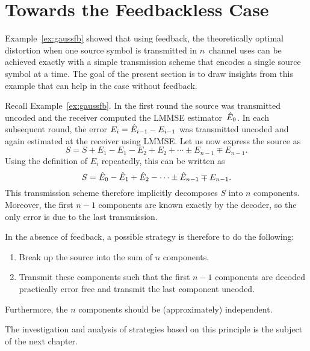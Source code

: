 \section{Towards the Feedbackless Case}

Example~\ref{ex:gaussfb} showed that using feedback, the theoretically optimal
distortion when one source symbol is transmitted in $n$~channel uses can be
achieved exactly with a simple transmission scheme that encodes a single source
symbol at a time. The goal of the present section is to draw insights from this
example that can help in the case without feedback. 

Recall Example~\ref{ex:gaussfb}. In the first round the source was
transmitted uncoded and the receiver computed the LMMSE estimator~$\hat{E}_0$. In
each subsequent round, the error $E_i = \hat{E}_{i-1} - E_{i-1}$ was transmitted
uncoded and again estimated at the receiver using LMMSE. Let us now express the
source as
\begin{equation*}
  S = S + E_1 - E_1 - E_2 + E_2 + \cdots \pm E_{n-1} \mp E_{n-1}.
\end{equation*}
Using the definition of $E_i$ repeatedly, this can be written as
\begin{equation*}
  S = \hat{E}_0 - \hat{E}_1 + \hat{E}_2 - \cdots \pm \hat{E}_{n-1} \mp E_{n-1}.
\end{equation*}
This transmission scheme therefore implicitly decomposes $S$ into $n$
components. Moreover, the first $n-1$ components are known exactly by the
decoder, so the only error is due to the last transmission.

In the absence of feedback, a possible strategy is therefore to do the
following:
\begin{enumerate}
  \item Break up the source into the sum of $n$ components.
  \item Transmit these components such that the first $n-1$ components are
    decoded practically error free and transmit the last component uncoded.
\end{enumerate}
Furthermore, the $n$ components should be (approximately) independent.

The investigation and analysis of strategies based on this principle is the
subject of the next chapter. 

